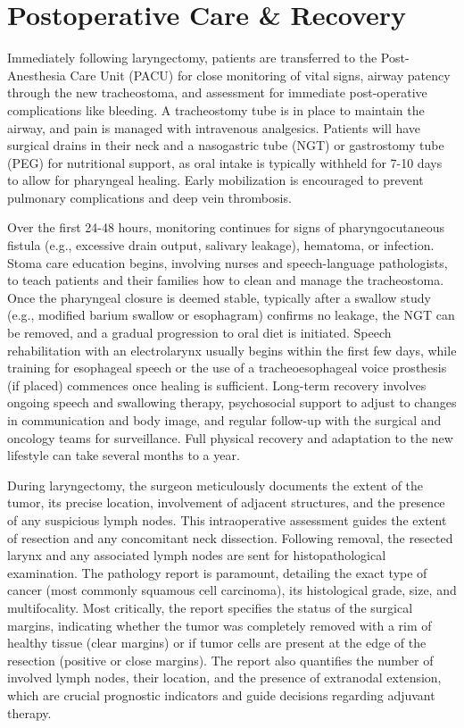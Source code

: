 \section*{Postoperative Care \& Recovery}
Immediately following laryngectomy, patients are transferred to the Post-Anesthesia Care Unit (PACU) for close monitoring of vital signs, airway patency through the new tracheostoma, and assessment for immediate post-operative complications like bleeding. A tracheostomy tube is in place to maintain the airway, and pain is managed with intravenous analgesics. Patients will have surgical drains in their neck and a nasogastric tube (NGT) or gastrostomy tube (PEG) for nutritional support, as oral intake is typically withheld for 7-10 days to allow for pharyngeal healing. Early mobilization is encouraged to prevent pulmonary complications and deep vein thrombosis.

Over the first 24-48 hours, monitoring continues for signs of pharyngocutaneous fistula (e.g., excessive drain output, salivary leakage), hematoma, or infection. Stoma care education begins, involving nurses and speech-language pathologists, to teach patients and their families how to clean and manage the tracheostoma. Once the pharyngeal closure is deemed stable, typically after a swallow study (e.g., modified barium swallow or esophagram) confirms no leakage, the NGT can be removed, and a gradual progression to oral diet is initiated. Speech rehabilitation with an electrolarynx usually begins within the first few days, while training for esophageal speech or the use of a tracheoesophageal voice prosthesis (if placed) commences once healing is sufficient. Long-term recovery involves ongoing speech and swallowing therapy, psychosocial support to adjust to changes in communication and body image, and regular follow-up with the surgical and oncology teams for surveillance. Full physical recovery and adaptation to the new lifestyle can take several months to a year.

During laryngectomy, the surgeon meticulously documents the extent of the tumor, its precise location, involvement of adjacent structures, and the presence of any suspicious lymph nodes. This intraoperative assessment guides the extent of resection and any concomitant neck dissection. Following removal, the resected larynx and any associated lymph nodes are sent for histopathological examination. The pathology report is paramount, detailing the exact type of cancer (most commonly squamous cell carcinoma), its histological grade, size, and multifocality. Most critically, the report specifies the status of the surgical margins, indicating whether the tumor was completely removed with a rim of healthy tissue (clear margins) or if tumor cells are present at the edge of the resection (positive or close margins). The report also quantifies the number of involved lymph nodes, their location, and the presence of extranodal extension, which are crucial prognostic indicators and guide decisions regarding adjuvant therapy.

